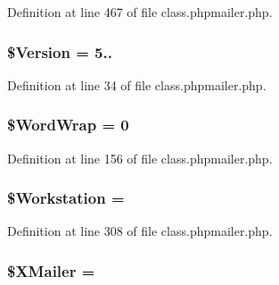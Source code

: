 Definition at line 467 of file class.\+phpmailer.\+php.

\subsubsection[{\texorpdfstring{\$\+Version}{$Version}}]{\setlength{\rightskip}{0pt plus 5cm}\$Version = \textquotesingle{}5..\textquotesingle{}}\hypertarget{class_p_h_p_mailer_a8a43e1c8b245951155d04b279276af95}{}\label{class_p_h_p_mailer_a8a43e1c8b245951155d04b279276af95}


Definition at line 34 of file class.\+phpmailer.\+php.

\subsubsection[{\texorpdfstring{\$\+Word\+Wrap}{$WordWrap}}]{\setlength{\rightskip}{0pt plus 5cm}\$Word\+Wrap = 0}\hypertarget{class_p_h_p_mailer_a8e8553ff133401f5324229a988995a34}{}\label{class_p_h_p_mailer_a8e8553ff133401f5324229a988995a34}


Definition at line 156 of file class.\+phpmailer.\+php.

\subsubsection[{\texorpdfstring{\$\+Workstation}{$Workstation}}]{\setlength{\rightskip}{0pt plus 5cm}\$Workstation = \textquotesingle{}\textquotesingle{}}\hypertarget{class_p_h_p_mailer_a4523ff0871ac0a83f9e05c700d40b2a2}{}\label{class_p_h_p_mailer_a4523ff0871ac0a83f9e05c700d40b2a2}


Definition at line 308 of file class.\+phpmailer.\+php.

\subsubsection[{\texorpdfstring{\$\+X\+Mailer}{$XMailer}}]{\setlength{\rightskip}{0pt plus 5cm}\$X\+Mailer = \textquotesingle{}\textquotesingle{}}\hypertarget{class_p_h_p_mailer_a1aca2514bdfdd3df32db20e762f0c85d}{}\label{class_p_h_p_mailer_a1aca2514bdfdd3df32db20e762f0c85d}


